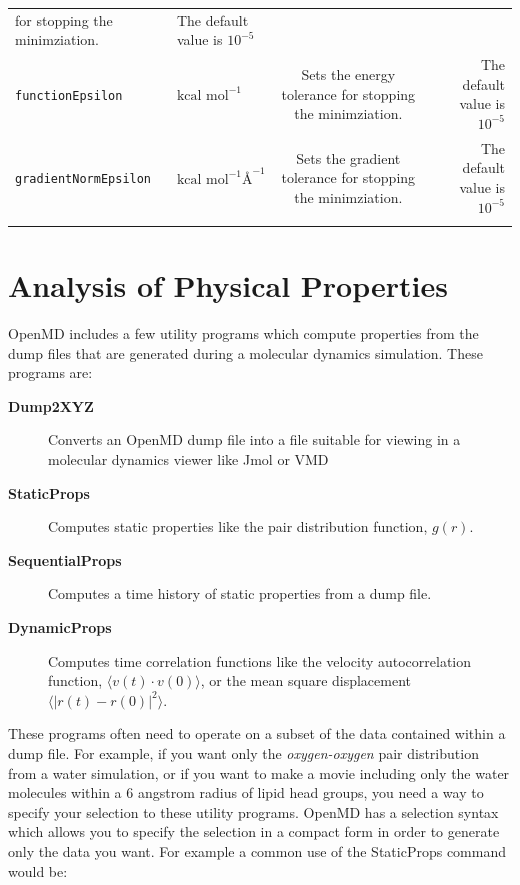 \documentclass[]{book}
\begin{document}
\begin{longtable}[c]{ABCD}
                                                for stopping the minimziation. & The default value is $10^{-5}$\\
  {\tt functionEpsilon} & $\mbox{kcal mol}^{-1}$ &Sets the energy tolerance
                                                for stopping the minimziation. & The default value
                                                                           is  $10^{-5}$\\ 
  {\tt gradientNormEpsilon} & $\mbox{kcal mol}^{-1}\mbox{\AA}^{-1}$  &Sets the gradient tolerance
                                                for stopping the minimziation. & The default 
                                                                                                                   value is $10^{-5}$\\ 
\label{table:minimizeParams}
\end{longtable}

\chapter{\label{section:anal}Analysis of Physical Properties}

{\sc OpenMD} includes a few utility programs which compute properties
from the dump files that are generated during a molecular dynamics
simulation.  These programs are:

\begin{description}
\item[{\bf Dump2XYZ}] Converts an {\sc OpenMD} dump file into a file
suitable for viewing in a molecular dynamics viewer like Jmol or VMD
\item[{\bf StaticProps}] Computes static properties like the pair
distribution function, $g(r)$.
\item[{\bf SequentialProps}] Computes a time history of static
  properties from a dump file.
\item[{\bf DynamicProps}] Computes time correlation functions like the
velocity autocorrelation function, $\langle v(t) \cdot v(0)\rangle$,
or the mean square displacement $\langle |r(t) - r(0)|^{2} \rangle$.
\end{description}

These programs often need to operate on a subset of the data contained
within a dump file.  For example, if you want only the {\it oxygen-oxygen}
pair distribution from a water simulation, or if you want to make a
movie including only the water molecules within a 6 angstrom radius of
lipid head groups, you need a way to specify your selection to these
utility programs.  {\sc OpenMD} has a selection syntax which allows you to
specify the selection in a compact form in order to generate only the
data you want.  For example a common use of the StaticProps command
would be:
\end{document}
